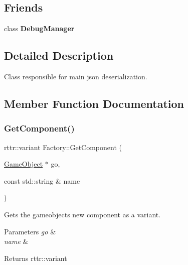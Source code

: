 \subsection*{Friends}
\begin{DoxyCompactItemize}
\item 
\mbox{\label{classFactory_aa81a2e787af81f4fb4b7322fce0b27be}} 
class {\bfseries Debug\+Manager}
\end{DoxyCompactItemize}


\subsection{Detailed Description}
Class responsible for main json deserialization. 

\subsection{Member Function Documentation}
\mbox{\label{classFactory_ab82e64c1c79db2e80e7110fbd2ed180c}} 
\subsubsection{\texorpdfstring{Get\+Component()}{GetComponent()}}
{\footnotesize\ttfamily rttr\+::variant Factory\+::\+Get\+Component (\begin{DoxyParamCaption}\item[{\hyperlink{classGameObject}{Game\+Object} $\ast$}]{go,  }\item[{const std\+::string \&}]{name }\end{DoxyParamCaption})\hspace{0.3cm}{\ttfamily [static]}}



Gets the gameobject\textquotesingle{}s new component as a variant. 


\begin{DoxyParams}{Parameters}
{\em go} & \\
\hline
{\em name} & \\
\hline
\end{DoxyParams}
\begin{DoxyReturn}{Returns}
rttr\+::variant 
\end{DoxyReturn}
\mbox{\label{classFactory_afd40f0b1d5fe75186a2944631230dddb}} 
